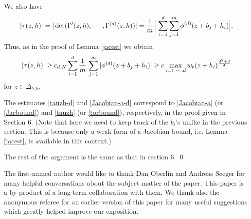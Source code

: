 \documentclass[11 pt]{amsart}
\theoremstyle{plain}
\numberwithin{equation}{section}
\theoremstyle{plain}
\numberwithin{equation}{section}
\theoremstyle{remark}
\begin{document}
We also have
\begin{equation*}\label{}
|\tau(z,h)| = |\det (\Gamma'(z,h), \cdots, \Gamma^{(d)}(z,h))| = {1\over m}\, \Big| \sum_{i=1}^d \sum_{j=1}^m \phi
^{(d)} (z+ b_j+ h_i) \Big| .
\end{equation*}
Thus, as in the proof of Lemma \ref{jacest} we obtain
\begin{equation}\label{tauzh-d}
 |\tau(z,h)| \ge c_{d,N} \sum_{i=1}^d {1\over m}\, \sum_{j=1}^m |\phi
^{(d)} (z+ b_j+ h_i)| \ge c \max_{i=1,\cdots,d} w_b (z+ h_i)^\frac{d^2+d}{4}
\end{equation}
for $z \in \Delta_{b,h}$.

The estimates \eqref{tauzh-d} and \eqref{Jacobian-a-d} correspond to \eqref{Jacobian-a} (or \eqref{Jacbound}) and \eqref{tauzh} (or \eqref{torbound}), respectively, in the proof given in Section 6. (Note that here we need to keep track of the $b_i$'s unlike in the previous section. This is because only a weak form of a Jacobian bound, i.e. Lemma \ref{jacest}, is available in this context.)

The rest of the argument is the same as that in section 6. \qed

\medskip

The first-named author would like to thank
Dan Oberlin and Andreas Seeger for many helpful conversations about the subject matter of the paper. This paper is a by-product of a long-term collaboration with them. We thank also the anonymous referee for an earlier version of this paper for many useful suggestions which greatly helped improve our exposition.
\end{document}
